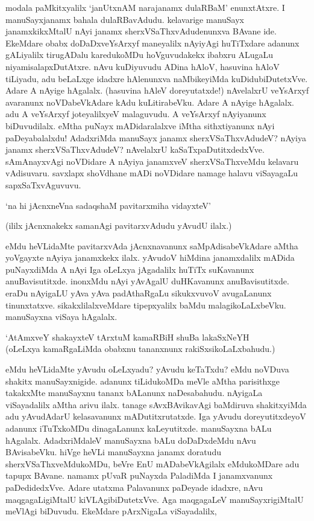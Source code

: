 modala paMkitxyalilx `janUtxnAM narajanamx dulaRBaM' enunxtAtxre. I manuSayxjanamx bahala dulaRBavAdudu. kelavarige manuSayx janamxkikxMtalU nAyi janamx sherxVSaThxvAdudenunxva BAvane ide. EkeMdare obabx doDaDxveYsArxyf maneyalilx nAyiyAgi huTiTxdare adanunx gALiyalilx tirugADalu karedukoMDu hoVguvudakekx ibabxru ALugaLu niyamisalapxDutAtxre. nAvu kuDiyuvudu ADina hAloV, hasuvina hAloV tiLiyadu, adu beLaLxge idadxre hAlenunxva naMbikeyiMda kuDidubiDutetxVve. Adare A nAyige hAgalalx. (hasuvina hAleV doreyutatxde!) nAvelalxrU veYsArxyf avaranunx noVDabeVkAdare kAdu kuLitirabeVku. Adare A nAyige hAgalalx. adu A veYsArxyf joteyalilxyeV malaguvudu. A veYsArxyf nAyiyanunx biDuvudilalx. eMtha puNayx mADidaralalxve iMtha sithxtiyanunx nAyi paDeyabalalxdu! AdadxriMda manuSayx janamx sherxVSaThxvAdudeV? nAyiya janamx sherxVSaThxvAdudeV? nAvelalxrU kaSaTxpaDutitxdedxVve. sAmAnayxvAgi noVDidare A nAyiya janamxveV sherxVSaThxveMdu kelavaru vAdisuvaru. savxlapx shoVdhane mADi noVDidare namage halavu viSayagaLu sapxSaTxvAguvuvu.

\begin{shloka}
`na hi jAcnxneVna sadaqshaM pavitarxmiha vidayxteV'
\end{shloka}

(ililx jAcnxnakekx samanAgi pavitarxvAdudu yAvudU ilalx.)

eMdu heVLidaMte pavitarxvAda jAcnxnavanunx saMpAdisabeVkAdare aMtha yoVgayxte nAyiya janamxkekx ilalx. yAvudoV hiMdina janamxdalilx mADida puNayxdiMda A nAyi Iga oLeLxya jAgadalilx huTiTx suKavanunx anuBavisutitxde. inonxMdu nAyi yAvAgalU duHKavanunx anuBavisutitxde. eraDu nAyigaLU yAva yAva padAthaRgaLu sikukxvuvoV avugaLanunx tinunxtatxve. sikakxlilalxveMdare tipepxyalilx baMdu malagikoLaLxbeVku. manuSayxna viSaya hAgalalx.

\begin{shloka}
`AtAmxveY shakayxteV tArxtuM kamaRBiH shuBa lakaSxNeYH\\
(oLeLxya kamaRgaLiMda obabxnu tananxnunx rakiSxsikoLaLxbahudu.)
\end{shloka}

\noindent eMdu heVLidaMte yAvudu oLeLxyadu? yAvudu keTaTxdu? eMdu noVDuva shakitx manuSayxnigide. adanunx tiLidukoMDa meVle aMtha parisithxge takakxMte manuSayxnu tananx bALanunx naDesabahudu. nAyigaLa viSayadalilx aMtha arivu ilalx. tanage sAvxBAvikavAgi baMdiruva shakitxyiMda adu yAvudAdarU kelasavanunx mADutitxrutatxde. Iga yAvudu doreyutitxdeyoV adanunx iTuTxkoMDu dinagaLanunx kaLeyutitxde. manuSayxna bALu hAgalalx. AdadxriMdaleV manuSayxna bALu doDaDxdeMdu nAvu BAvisabeVku. hiVge heVLi manuSayxna janamx doratudu sherxVSaThxveMdukoMDu, beVre EnU mADabeVkAgilalx eMdukoMDare adu tapupx BAvane. namamx pUvaR puNayxda PaladiMda I janamxvanunx paDedidedxVve. Adare utatxma Palavanunx paDeyade idadxre, nAvu maqgagaLigiMtalU kiVLAgibiDutetxVve. Aga maqgagaLeV manuSayxrigiMtalU meVlAgi biDuvudu. EkeMdare pArxNigaLa viSayadalilx,


